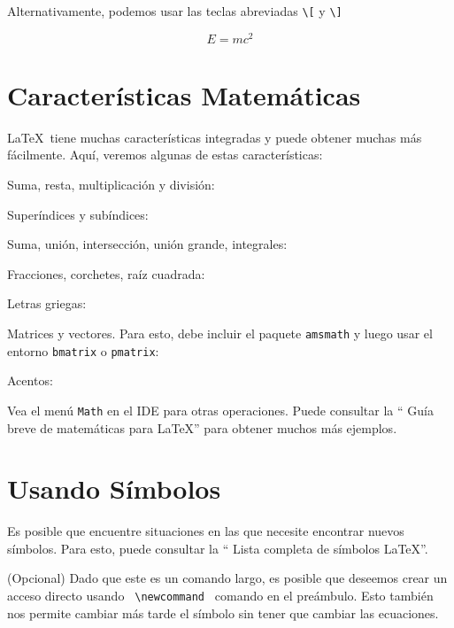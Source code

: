 \documentclass{article}
\begin{document}
	Alternativamente, podemos usar las teclas abreviadas \verb|\[| y \verb|\]|
	
	\[
	E=mc^2
	\]
	
	\section{Características Matemáticas}
	\LaTeX\ tiene muchas características integradas y puede obtener muchas más fácilmente. Aquí, veremos algunas de estas características:
	
	Suma, resta, multiplicación y división:
	
	
	Superíndices y subíndices:
	
	
	
	Suma, unión, intersección, unión grande, integrales:
	
	
	
	Fracciones, corchetes, raíz cuadrada:
	
	
	Letras griegas:
	
	
	
	Matrices y vectores. Para esto, debe incluir el paquete \texttt {amsmath} y luego usar el entorno \texttt {bmatrix} o \texttt {pmatrix}:
	
	
	Acentos:
	
	
	
	Vea el menú \texttt {Math} en el IDE para otras operaciones. Puede consultar la `` Guía breve de matemáticas para \LaTeX '' para obtener muchos más ejemplos. 
	
	\section{Usando Símbolos} 
	Es posible que encuentre situaciones en las que necesite encontrar nuevos símbolos. Para esto, puede consultar la `` Lista completa de símbolos \LaTeX ''.
	
	
	
	
	
	(Opcional) Dado que este es un comando largo, es posible que deseemos crear un acceso directo usando \verb| \newcommand | comando en el preámbulo. Esto también nos permite cambiar más tarde el símbolo sin tener que cambiar las ecuaciones.
	
	
\end{document}
